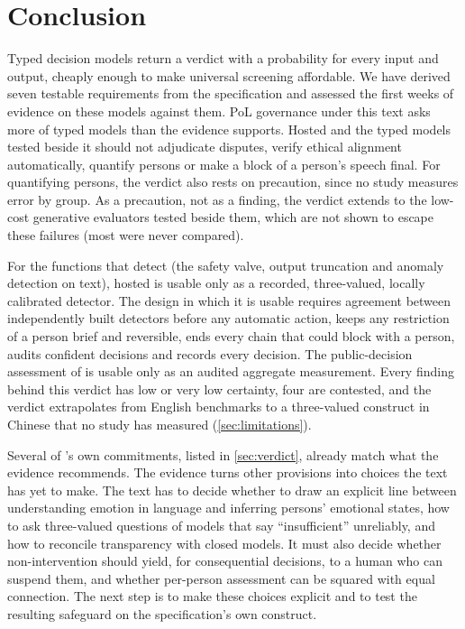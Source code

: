 \section{Conclusion}
\label{sec:conclusion}

Typed decision models return a verdict with a probability for every input and output, cheaply enough to make universal screening affordable.
We have derived seven testable requirements from the \pol{} specification and assessed the first weeks of evidence on these models against them.
PoL governance under this text asks more of typed models than the evidence supports.
Hosted \jev{} and the typed models tested beside it should not adjudicate disputes, verify ethical alignment automatically, quantify persons or make a block of a person's speech final.
For quantifying persons, the verdict also rests on precaution, since no study measures error by group.
As a precaution, not as a finding, the verdict extends to the low-cost generative evaluators tested beside them, which are not shown to escape these failures (most were never compared).

For the functions that detect (the safety valve, output truncation and anomaly detection on text), hosted \jev{} is usable only as a recorded, three-valued, locally calibrated detector.
The design in which it is usable requires agreement between independently built detectors before any automatic action, keeps any restriction of a person brief and reversible, ends every chain that could block with a person, audits confident decisions and records every decision.
The public-decision assessment of  is usable only as an audited aggregate measurement.
Every finding behind this verdict has low or very low certainty, four are contested, and the verdict extrapolates from English benchmarks to a three-valued construct in Chinese that no study has measured (\cref{sec:limitations}).

Several of \pol{}'s own commitments, listed in \cref{sec:verdict}, already match what the evidence recommends.
The evidence turns other provisions into choices the text has yet to make.
The text has to decide whether to draw an explicit line between understanding emotion in language and inferring persons' emotional states, how to ask three-valued questions of models that say ``insufficient'' unreliably, and how to reconcile transparency with closed models.
It must also decide whether non-intervention should yield, for consequential decisions, to a human who can suspend them, and whether per-person assessment can be squared with equal connection.
The next step is to make these choices explicit and to test the resulting safeguard on the specification's own construct.
